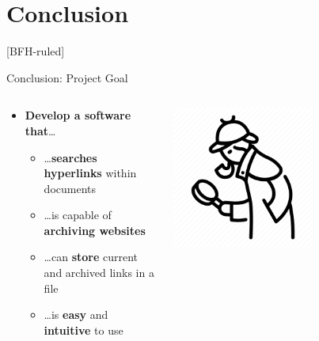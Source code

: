 \documentclass[
ngerman,%
authorontitle=true,
]{bfhbeamer}
\begin{document}
	\section{Conclusion}
	[BFH-ruled]
	\frame{\sectionpage}
	
	\begin{frame}{Conclusion: Project Goal}
		\begin{columns} %
			\begin{column}{0.5\textwidth} %
				\begin{itemize}
					\item[\checkmark] \textbf{Develop a software that}\ldots
					\begin{itemize}
						\item[\checkmark] \ldots \textbf{searches hyperlinks} within documents
						\item[\checkmark] \ldots is capable of \textbf{archiving websites}
						\item[\checkmark] \ldots can \textbf{store} current and archived links in a file
						\item[\checkmark] \ldots is \textbf{easy} and \textbf{intuitive} to use
					\end{itemize}
				\end{itemize}
			\end{column}
			\begin{column}{0.3\textwidth} %
				\begin{center}
					\includegraphics[width=0.6\textwidth]{pictures/sherlock}
				\end{center}
			\end{column}
		\end{columns}
	\end{frame}
	
\end{document}
